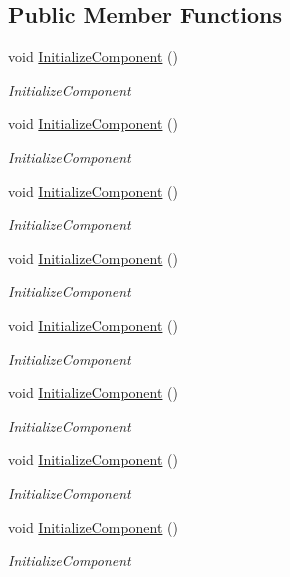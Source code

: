 \subsection*{Public Member Functions}
\begin{DoxyCompactItemize}
\item 
void \hyperlink{classtwelve_1_1_app_ab0d20aed6e986a2ea798b4fc86ae7b10}{Initialize\+Component} ()
\begin{DoxyCompactList}\small\item\em Initialize\+Component \end{DoxyCompactList}\item 
void \hyperlink{classtwelve_1_1_app_ab0d20aed6e986a2ea798b4fc86ae7b10}{Initialize\+Component} ()
\begin{DoxyCompactList}\small\item\em Initialize\+Component \end{DoxyCompactList}\item 
void \hyperlink{classtwelve_1_1_app_ab0d20aed6e986a2ea798b4fc86ae7b10}{Initialize\+Component} ()
\begin{DoxyCompactList}\small\item\em Initialize\+Component \end{DoxyCompactList}\item 
void \hyperlink{classtwelve_1_1_app_ab0d20aed6e986a2ea798b4fc86ae7b10}{Initialize\+Component} ()
\begin{DoxyCompactList}\small\item\em Initialize\+Component \end{DoxyCompactList}\item 
void \hyperlink{classtwelve_1_1_app_ab0d20aed6e986a2ea798b4fc86ae7b10}{Initialize\+Component} ()
\begin{DoxyCompactList}\small\item\em Initialize\+Component \end{DoxyCompactList}\item 
void \hyperlink{classtwelve_1_1_app_ab0d20aed6e986a2ea798b4fc86ae7b10}{Initialize\+Component} ()
\begin{DoxyCompactList}\small\item\em Initialize\+Component \end{DoxyCompactList}\item 
void \hyperlink{classtwelve_1_1_app_ab0d20aed6e986a2ea798b4fc86ae7b10}{Initialize\+Component} ()
\begin{DoxyCompactList}\small\item\em Initialize\+Component \end{DoxyCompactList}\item 
void \hyperlink{classtwelve_1_1_app_ab0d20aed6e986a2ea798b4fc86ae7b10}{Initialize\+Component} ()
\begin{DoxyCompactList}\small\item\em Initialize\+Component \end{DoxyCompactList}\end{DoxyCompactItemize}
